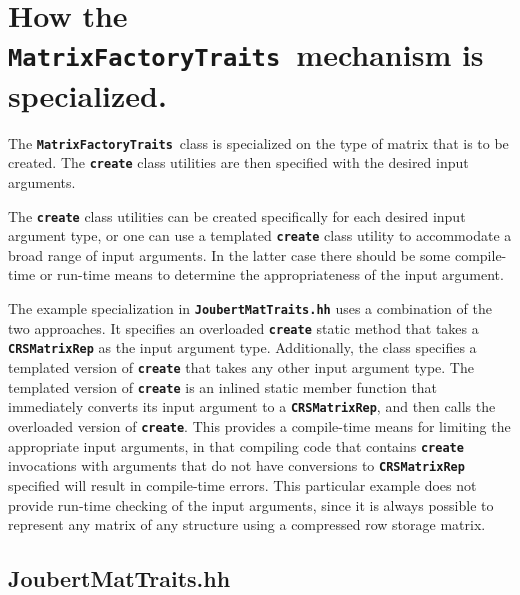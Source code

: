 \documentclass[11pt]{nmemo}
\newcommand{\cxxcode}{\color{codecolor}}
\newcommand{\code}[1]{\textbf{\texttt{\textcolor{codecolor}{#1}}}}
\newcommand{\MFT}{\code{Matrix\-Factory\-Traits}\ }
\begin{document}
\begin{ttfamily}
\begin{small}
\cxxcode

\end{small}
\end{ttfamily}

\section{How the \MFT mechanism is specialized.}

The \MFT class is specialized on the type of matrix that is to be created.
The \code{create} class utilities are then specified with the desired input
arguments.

The \code{create} class utilities can be created specifically for each desired
input argument type, or one can use a templated \code{create} class utility
to accommodate a broad range of input arguments.
In the latter case there should be some compile-time or run-time means
to determine the appropriateness of the input argument.

The example specialization in \code{JoubertMatTraits.hh} uses a combination
of the two approaches.
It specifies an overloaded \code{create} static method that takes a
\code{CRSMatrixRep} as the
input argument type.
Additionally, the class specifies a templated version of \code{create}
that takes any other input argument type.
The templated version of \code{create} is an inlined static member function
that immediately converts its input argument to a \code{CRSMatrixRep}, and
then calls the overloaded version of \code{create}.
This provides
a compile-time means for limiting the appropriate input arguments, in
that compiling code that contains \code{create} invocations with
arguments that do not have conversions to \code{CRSMatrixRep} specified
will result in compile-time errors.
This particular example does not provide run-time checking of the input
arguments, since it is always possible to represent any matrix of any
structure using a compressed row storage matrix.

\subsection{JoubertMatTraits.hh}

\begin{ttfamily}
\begin{small}
\cxxcode

\end{small}
\end{ttfamily}
\end{document}

